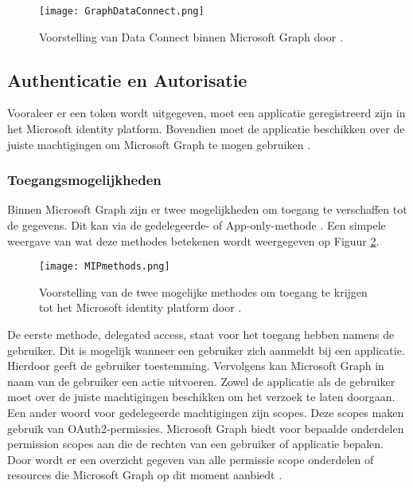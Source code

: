 \begin{figure}[!h]
    \texttt{[image: GraphDataConnect.png]}
    \caption[Voorbeeld Microsoft Graph Data Connect]{Voorstelling van Data Connect binnen Microsoft Graph door \textcite{Microsoft2022c}.}
    \label{MSGDC}
\end{figure}



\subsection{Authenticatie en Autorisatie}

Vooraleer er een token wordt uitgegeven, moet een applicatie geregistreerd zijn in het Microsoft identity platform. Bovendien moet de applicatie beschikken over de juiste machtigingen om Microsoft Graph te mogen gebruiken \autocite{Microsoft2022b}.

\subsubsection{Toegangsmogelijkheden}

Binnen Microsoft Graph zijn er twee mogelijkheden om toegang te verschaffen tot de gegevens. Dit kan via de gedelegeerde- of App-only-methode \autocite{Microsoft2022b}. Een simpele weergave van wat deze methodes betekenen wordt weergegeven op Figuur \ref{MIPM}. \\

\begin{figure}[h]
    \texttt{[image: MIPmethods.png]}
    \caption[Voorbeeld toegangsmogelijkheden]{Voorstelling van de twee mogelijke methodes om toegang te krijgen tot het Microsoft identity platform door \autocite{Microsoft2022b}.}
    \label{MIPM}
\end{figure}

De eerste methode, delegated access, staat voor het toegang hebben namens de gebruiker. Dit is mogelijk wanneer een gebruiker zich aanmeldt bij een applicatie. Hierdoor geeft de gebruiker toestemming. Vervolgens kan Microsoft Graph in naam van de gebruiker een actie uitvoeren. Zowel de applicatie als de gebruiker moet over de juiste machtigingen beschikken om het verzoek te laten doorgaan. Een ander woord voor gedelegeerde machtigingen zijn scopes. Deze scopes maken gebruik van OAuth2-permissies. Microsoft Graph biedt voor bepaalde onderdelen permission scopes aan die de rechten van een gebruiker of applicatie bepalen. Door \textcite{Microsoft2023p} wordt er een overzicht gegeven van alle permissie scope onderdelen of resources die Microsoft Graph op dit moment aanbiedt \autocite{Microsoft2022b}. \\

